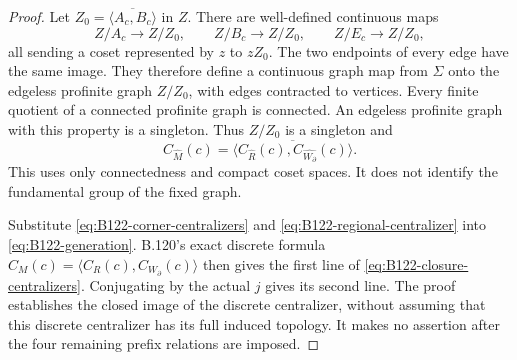 \begin{proof}
Let $Z_0=\overline{\langle A_c,B_c\rangle}$ in $Z$.
There are well-defined continuous maps
\[
 Z/A_c\longrightarrow Z/Z_0,\qquad
 Z/B_c\longrightarrow Z/Z_0,\qquad
 Z/E_c\longrightarrow Z/Z_0,
\]
all sending a coset represented by $z$ to $zZ_0$. The two
endpoints of every edge have the same image. They therefore
define a continuous graph map from $\Sigma$ onto the edgeless
profinite graph $Z/Z_0$, with edges contracted to vertices.
Every finite quotient of a connected profinite graph is connected.
An edgeless profinite graph with this property is a singleton.
Thus $Z/Z_0$ is a singleton and
\begin{equation}\label{eq:B122-generation}
 C_{\widehat M}(c)=\overline{\langle
                 C_{\widehat R}(c),
                 C_{\widehat{W_{\partial}}}(c)\rangle}.
\end{equation}
This uses only connectedness and compact coset spaces. It does
not identify the fundamental group of the fixed graph.

Substitute \eqref{eq:B122-corner-centralizers} and
\eqref{eq:B122-regional-centralizer} into
\eqref{eq:B122-generation}. B.120's exact discrete formula
$C_M(c)=\langle C_R(c),C_{W_{\partial}}(c)\rangle$
then gives the first line of
\eqref{eq:B122-closure-centralizers}. Conjugating by the actual
$j$ gives its second line. The proof establishes the closed image
of the discrete centralizer, without assuming that this discrete
centralizer has its full induced topology. It makes no assertion
after the four remaining prefix relations are imposed.
\end{proof}

